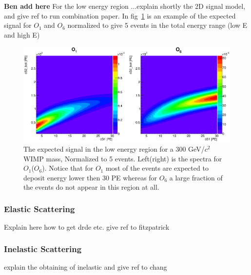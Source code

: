\textbf{Ben add here} For the low energy region ...explain shortly the 2D signal model, and give ref to run combination paper. In fig~\ref{fig:LowE} is an example of the expected signal for $O_1$ and $O_6$ normalized to give 5 events in the total energy range (low E and high E)
\begin{figure}[h!]
\begin{minipage}{1.\linewidth}
\centerline{\includegraphics[width=1.\linewidth]{Figures/SigLowO1O6.eps}}
\end{minipage}
\caption{The expected signal in the low energy region for a 300 GeV/$c^2$ WIMP mass, Normalized to 5 events. Left(right) is the spectra for $O_1$($O_6$). Notice that for $O_1$ most of the events are expected to deposit energy lower then 30 PE whereas for $O_6$ a large fraction of the events do not appear in this region at all.}
\label{fig:LowE}
\end{figure}





\subsubsection{Elastic Scattering}
\label{subsubsec:Elastic}
Explain here how to get drde etc. give ref to fitzpatrick
\subsubsection{Inelastic Scattering}
\label{subsubsec:Inelastic}
explain the obtaining of inelastic and give ref to chang